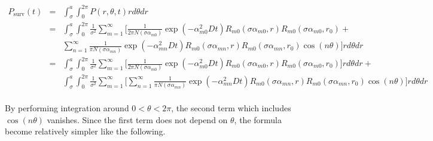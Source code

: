 \documentclass{article}
\begin{document}
\begin{eqnarray}
    P_{\mathrm{surv}}(t) &=& \int_\sigma^a \int_0^{2\pi} P(r, \theta, t) rd\theta dr\\
        &=& \int_\sigma^a \int_0^{2\pi}  \frac{1}{\sigma^2}
            \sum_{m=1}^{\infty}\Bigg[
                \frac{1}{2\pi N(\sigma\alpha_{m0})} \exp(-\alpha_{m0}^2Dt)
                R_{m0}(\sigma\alpha_{m0}, r) R_{m0}(\sigma\alpha_{m0}, r_0) +
                \nonumber\\
                & &\sum_{n=1}^{\infty} \frac{1}{\pi N(\sigma\alpha_{mn})}
                \exp(-\alpha_{mn}^2Dt)
                R_{m0}(\sigma\alpha_{mn}, r) R_{m0}(\sigma\alpha_{mn}, r_0)\cos(n\theta)
            \Bigg] r d\theta dr\\
        &=& \int_\sigma^a \int_0^{2\pi} \frac{1}{\sigma^2} \sum_{m=1}^{\infty} \Bigg[
                \frac{1}{2\pi N(\sigma\alpha_{m0})} \exp(-\alpha_{m0}^2Dt)
                R_{m0}(\sigma\alpha_{m0}, r) R_{m0}(\sigma\alpha_{m0}, r_0)\Bigg] r d\theta dr +
                \nonumber\\
        & &\int_\sigma^a \int_0^{2\pi} \frac{1}{\sigma^2} \sum_{m=1}^{\infty} \Bigg[
            \sum_{n=1}^{\infty} \frac{1}{\pi N(\sigma\alpha_{mn})}
                \exp(-\alpha_{mn}^2Dt)
                R_{m0}(\sigma\alpha_{mn}, r) R_{m0}(\sigma\alpha_{mn}, r_0)\cos(n\theta)
            \Bigg] r d\theta dr\\
\end{eqnarray}

By performing integration around $0 < \theta < 2\pi$, the second term which
includes $\cos(n\theta)$ vanishes. Since the first term does not depend on
$\theta$, the formula become relatively simpler like the following.
\end{document}
